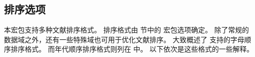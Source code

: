 \subsection{排序选项}
\label{use:srt}


本宏包支持多种文献排序格式。
排序格式由  节中的  宏包选项确定。
除了常规的数据域之外，还有一些特殊域也可用于优化文献排序。
 大致概述了 \biblatex 支持的字母顺序排序格式。
而年代顺序排序格式则列在  中。
以下依次是这些格式的一些解释。


